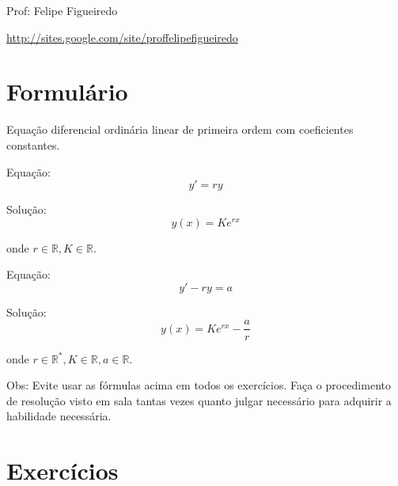 \documentclass[a4paper]{article}
\begin{document}
\parbox[c]{.825\textwidth}{\raggedright%
{Prof: Felipe Figueiredo\par}
{\url{http://sites.google.com/site/proffelipefigueiredo}}

\vspace{1cm}
}



\section{Formulário}

Equação diferencial ordinária linear de primeira ordem com
coeficientes constantes.

\bigskip
Equação:
\begin{displaymath}
  y' = ry
\end{displaymath}

Solução:
\begin{displaymath}
  y(x) = K e^{rx}
\end{displaymath}

onde $r \in \mathbb{R}, K \in \mathbb{R}$.

\bigskip

Equação:
\begin{displaymath}
  y' -ry = a
\end{displaymath}

Solução:
\begin{displaymath}
  y(x) = K e^{rx} - \frac{a}{r}
\end{displaymath}

onde $r \in \mathbb{R}^*, K \in \mathbb{R}, a \in \mathbb{R}$.

\bigskip
Obs: Evite usar as fórmulas acima em todos os exercícios. Faça o
procedimento de resolução visto em sala tantas vezes quanto julgar
necessário para adquirir a habilidade necessária.

\section{Exercícios}
\end{document}
